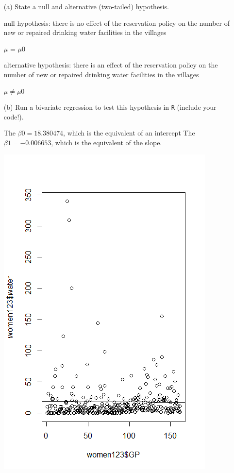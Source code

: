 \documentclass[12pt,letterpaper]{article}
\begin{document}
\newpage
\begin{enumerate}
	\item [(a)] State a null and alternative (two-tailed) hypothesis. 

null hypothesis: there is no effect of the reservation policy on the number of new or repaired drinking water facilities in the villages

$\mu$ = $\mu0$

alternative  hypothesis: there is an effect of the reservation policy on the number of new or repaired drinking water facilities in the villages

 $\mu \neq \mu0$
	\vspace{3cm}
	\item [(b)] Run a bivariate regression to test this hypothesis in \texttt{R} (include your code!).


The $\beta0 = 18.380474$, which is the equivalent of an intercept
The $\beta1 = -0.006653$, which is the equivalent of the slope.

\includegraphics{Q2}


\end{enumerate}
\end{document}
